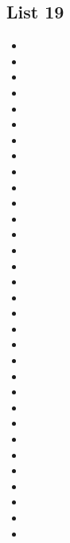\documentclass[a4paper,10pt]{article}
\begin{document}
\begin{CJK*}{UTF8}{gkai}
\section{List 19}
\begin{itemize}
\item 
\item 
\item 
\item 
\item 
\item 
\item 
\item 
\item 
\item 
\item 
\item 
\item 
\item 
\item 
\item 
\item 
\item 
\item 
\item 
\item 
\item 
\item 
\item 
\item 
\item 
\item 
\item 
\item 
\item 
\item 
\item 
\end{itemize}

\newpage

\end{CJK*}
\end{document}
